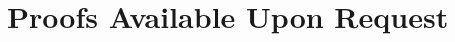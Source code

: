 \documentclass[11pt,a4paper]{article}
\theoremstyle{definition}
\begin{document}
\section{Proofs Available Upon Request}
\end{document}
